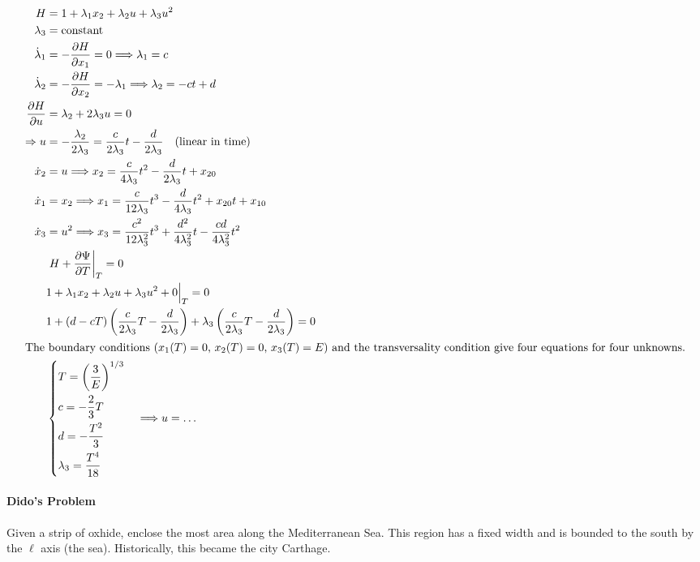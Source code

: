 \begin{align}
  H &= 1 + \lambda_1 x_2 + \lambda_2 u + \lambda_3 u^2 \\
  \lambda_3 &= \text{constant} \\
  \dot\lambda_1 &= -\frac{\partial H}{\partial x_1} = 0 \Longrightarrow \lambda_1 = c \\
  \dot\lambda_2 &= -\frac{\partial H}{\partial x_2} = -\lambda_1 \Longrightarrow \lambda_2 = -ct + d \\
  \frac{\partial H}{\partial u} &= \lambda_2 + 2\lambda_3 u = 0 \\
  \Rightarrow u &= -\frac{\lambda_2}{2\lambda_3} = \frac{c}{2\lambda_3} t - \frac{d}{2\lambda_3} \quad \text{(linear in time)} \\
  \dot x_2 &= u \Longrightarrow x_2 = \frac{c}{4\lambda_3} t^2 - \frac{d}{2\lambda_3} t + x_{20} \\
  \dot x_1 &= x_2 \Longrightarrow x_1 = \frac{c}{12\lambda_3} t^3 - \frac{d}{4\lambda_3} t^2 + x_{20} t + x_{10} \\
  \dot x_3 &= u^2 \Longrightarrow x_3 = \frac{c^2}{12\lambda_3^2} t^3 + \frac{d^2}{4\lambda_3^2} t - \frac{cd}{4\lambda_3^2} t^2 \\
    & \left. H + \frac{\partial \Psi}{\partial T} \right|_T = 0 \\
    & 1 + \lambda_1 x_2 + \lambda_2 u + \lambda_3 u^2 + 0 \Big|_T = 0 \\
    & 1 + (d-cT) \left(\frac{c}{2\lambda_3} T - \frac{d}{2\lambda_3}\right) + \lambda_3 \left(\frac{c}{2\lambda_3} T - \frac{d}{2\lambda_3}\right) = 0 \\
  \shortintertext{The boundary conditions ($x_1(T)=0$, $x_2(T)=0$, $x_3(T)=E$) and the transversality condition give four equations for four unknowns.}
  & \begin{dcases}
    T = \left(\frac{3}{E}\right)^{1/3} \\
    c = -\frac{2}{3} T \\
    d = -\frac{T^2}{3} \\
    \lambda_3 = \frac{T^4}{18}
  \end{dcases} \quad \Longrightarrow u = \dots
\end{align}
\allowdisplaybreaks[0]

\paragraph{Dido's Problem}
Given a strip of oxhide, enclose the most area along the Mediterranean Sea. This region has a fixed width and is bounded to the south by the $\ell$ axis (the sea). Historically, this became the city Carthage.

